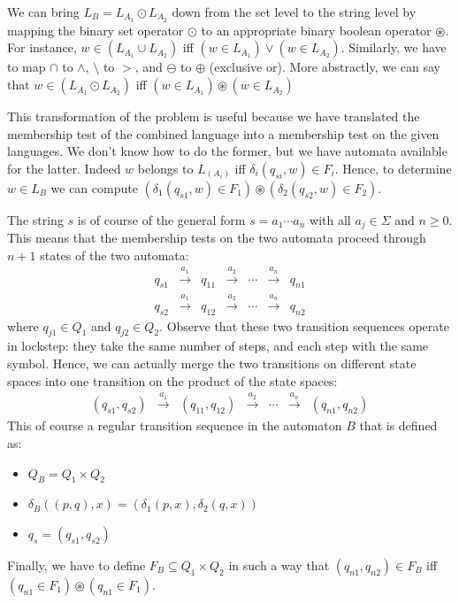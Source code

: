We can bring $L_B = L_{A_1} \odot L_{A_2}$ down from the set level to the
string level by mapping the binary set operator $\odot$ to an appropriate binary
boolean operator $\circledast$. For instance, $w \in (L_{A_1} \cup L_{A_2})$
iff $(w \in L_{A_1}) \vee (w \in L_{A_2})$. Similarly, we have to map $\cap$ to $\wedge$,
$\setminus$ to $>$, and $\ominus$ to $\oplus$ (exclusive or). More abstractly, 
we can say that $w \in (L_{A_1} \odot L_{A_2})$ iff $(w \in L_{A_1}) \circledast (w \in L_{A_2})$

This transformation of the problem is useful because we have translated the
membership test of the combined language into a membership test on the given
languages. We don't know how to do the former, but we have automata available
for the latter. Indeed $w$ belongs to $L_(A_i)$ iff $\delta_i(q_{si},w) \in
F_i$. Hence, to determine $w \in L_B$ we can compute $(\delta_1(q_{s1},w) \in
F_1) \circledast (\delta_2(q_{s2},w) \in F_2)$.

The string $s$ is of course of the general form $s = a_1 \cdots a_n$ with all $a_j \in
\Sigma$ and $n \geq 0$. This means that the membership tests on the two automata proceed
through $n + 1$ states of the two automata:
\begin{equation*}
\begin{array}{ccccccc}
q_{s1} & \stackrel{a_1}{\longrightarrow} & q_{11} & \stackrel{a_2}{\longrightarrow} & \cdots & \stackrel{a_n}{\longrightarrow} & q_{n1} \\
q_{s2} & \stackrel{a_1}{\longrightarrow} & q_{12} & \stackrel{a_2}{\longrightarrow} & \cdots & \stackrel{a_n}{\longrightarrow} & q_{n2}
\end{array}
\end{equation*}
where $q_{j1} \in Q_1$ and $q_{j2} \in Q_2$. Observe that these two transition
sequences operate in lockstep: they take the same number of steps, and each
step with the same symbol. Hence, we can actually merge the two transitions 
on different state spaces into one transition on the product of the state spaces:
\begin{equation*}
\begin{array}{ccccccc}
(q_{s1}, q_{s2}) & \stackrel{a_1}{\longrightarrow} & (q_{11}, q_{12}) & \stackrel{a_2}{\longrightarrow} & \cdots & \stackrel{a_n}{\longrightarrow} & (q_{n1}, q_{n2}) 
\end{array}
\end{equation*}
This of course a regular transition sequence in the automaton $B$ that
is defined as:
\begin{itemize}
\item $Q_B = Q_1 \times Q_2$
\item $\delta_B((p, q),x) = (\delta_1(p,x), \delta_2(q,x))$
\item $q_s = (q_{s1}, q_{s2})$
\end{itemize}
Finally, we have to define $F_B \subseteq Q_1 \times Q_2$ in such a way 
that $(q_{n1},q_{n2}) \in F_B$ iff $(q_{n1} \in F_1) \circledast (q_{n1} \in F_1)$.


